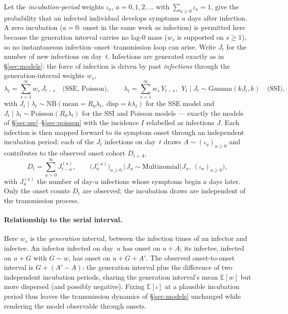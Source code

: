 \documentclass{article}
\theoremstyle{definition}
\begin{document}
Let the \emph{incubation-period} weights $\iota_a$, $a = 0, 1, 2, \ldots$ with
$\sum_{a \geq 0} \iota_a = 1$, give the probability that an infected individual
develops symptoms $a$ days after infection.  A zero incubation ($a = 0$: onset in
the same week as infection) is permitted here because the generation interval
carries no lag-0 mass ($w_s$ is supported on $s \geq 1$), so no instantaneous
infection--onset--transmission loop can arise.  Write $J_t$ for the number of new
infections on day~$t$.  Infections are generated exactly as in
\S\ref{sec:models}: the force of infection is driven by past \emph{infections}
through the generation-interval weights $w_s$,
\begin{equation}\label{eq:bridge_foi}
  \lambda_t = \sum_{s=1}^{\infty} w_s\, J_{t-s}
  \quad\text{(SSE, Poisson)},
  \qquad
  \lambda_t = \sum_{s=1}^{\infty} w_s\, Y_{t-s},
  \ \ Y_t \mid J_t \sim \mathrm{Gamma}(k J_t, k)
  \quad\text{(SSI)},
\end{equation}
with $J_t \mid \lambda_t \sim \mathrm{NB}(\text{mean}=R_0\lambda_t,\
\text{disp}=k\lambda_t)$ for the SSE model and
$J_t \mid \lambda_t \sim \mathrm{Poisson}(R_0\lambda_t)$ for the SSI and Poisson
models --- exactly the models of \S\ref{sec:sse}--\S\ref{sec:poisson} with the
incidence $I$ relabelled as infections $J$.  Each infection is then mapped
forward to its symptom onset through an independent incubation period: each of
the $J_t$ infections on day~$t$ draws $A \sim (\iota_a)_{a\geq0}$ and contributes
to the observed onset cohort $D_{t+A}$,
\begin{equation}\label{eq:bridge_onsets}
  D_t = \sum_{a=0}^{\infty} J^{(a)}_{t-a},
  \qquad
  \bigl(J^{(a)}_u\bigr)_{a\geq0} \,\big|\, J_u \sim
  \mathrm{Multinomial}\bigl(J_u,\, (\iota_a)_{a\geq0}\bigr),
\end{equation}
with $J^{(a)}_u$ the number of day-$u$ infections whose symptoms begin $a$ days
later.  Only the onset counts $D_t$ are observed; the incubation draws are
independent of the transmission process.

\paragraph{Relationship to the serial interval.}
Here $w_s$ is the \emph{generation} interval, between the infection times of an
infector and infectee.  An infector infected on day~$u$ has onset on $u + A$; its
infectee, infected on $u + G$ with $G \sim w$, has onset on $u + G + A'$.  The
observed onset-to-onset interval is $G + (A' - A)$: the generation interval plus
the difference of two independent incubation periods, sharing the generation
interval's mean $\mathbb{E}[w]$ but more dispersed (and possibly negative).
Fixing $\mathbb{E}[\iota]$ at a plausible incubation period thus leaves the
transmission dynamics of \S\ref{sec:models} unchanged while rendering the model
observable through onsets.
\end{document}
